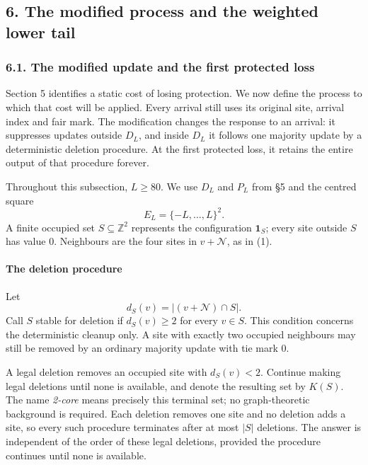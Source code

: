 \documentclass[
  11pt,
  a4paper,
]{article}
\begin{document}
\subsection{6. The modified process and the weighted lower
tail}\label{the-modified-process-and-the-weighted-lower-tail}

\subsubsection{6.1. The modified update and the first protected
loss}\label{the-modified-update-and-the-first-protected-loss}

Section 5 identifies a static cost of losing protection. We now define
the process to which that cost will be applied. Every arrival still uses
its original site, arrival index and fair mark. The modification changes
the response to an arrival: it suppresses updates outside \(D_L\), and
inside \(D_L\) it follows one majority update by a deterministic
deletion procedure. At the first protected loss, it retains the entire
output of that procedure forever.

Throughout this subsection, \(L\geq80\). We use \(D_L\) and \(P_L\) from
§5 and the centred square \[
E_L=\{-L,\ldots,L\}^2.
\] A finite occupied set \(S\subseteq\mathbb Z^2\) represents the
configuration \(\mathbf1_S\); every site outside \(S\) has value \(0\).
Neighbours are the four sites in \(v+\mathcal N\), as in (1).

\paragraph{The deletion procedure}\label{the-deletion-procedure}

Let \[
d_S(v)=|(v+\mathcal N)\cap S|.
\] Call \(S\) stable for deletion if \(d_S(v)\geq2\) for every
\(v\in S\). This condition concerns the deterministic cleanup only. A
site with exactly two occupied neighbours may still be removed by an
ordinary majority update with tie mark \(0\).

A legal deletion removes an occupied site with \(d_S(v)<2\). Continue
making legal deletions until none is available, and denote the resulting
set by \(K(S)\). The name \emph{2-core} means precisely this terminal
set; no graph-theoretic background is required. Each deletion removes
one site and no deletion adds a site, so every such procedure terminates
after at most \(|S|\) deletions. The answer is independent of the order
of these legal deletions, provided the procedure continues until none is
available.
\end{document}
